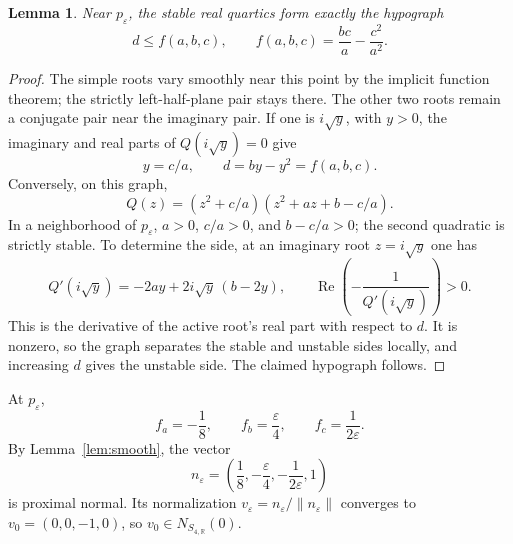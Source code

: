 \documentclass[11pt]{article}
\newtheorem{lemma}{Lemma}
\newcommand{\R}{\mathbb R}
\newcommand{\norm}[1]{\lVert #1\rVert}
\begin{document}
\begin{lemma}\label{lem:quarticboundary}
Near \(p_\varepsilon\), the stable real quartics form exactly the hypograph
\[
 d\leq f(a,b,c),\qquad
 f(a,b,c)=\frac{bc}{a}-\frac{c^2}{a^2}.
\]
\end{lemma}
\begin{proof}
The simple roots vary smoothly near this point by the implicit function theorem; the strictly left-half-plane pair stays there. The other two roots remain a conjugate pair near the imaginary pair. If one is \(i\sqrt y\), with \(y>0\), the imaginary and real parts of \(Q(i\sqrt y)=0\) give
\[
 y=c/a,\qquad d=by-y^2=f(a,b,c).
\]
Conversely, on this graph,
\[
 Q(z)=(z^2+c/a)(z^2+az+b-c/a).
\]
In a neighborhood of \(p_\varepsilon\), \(a>0\), \(c/a>0\), and \(b-c/a>0\); the second quadratic is strictly stable.
To determine the side, at an imaginary root \(z=i\sqrt y\) one has
\[
 Q'(i\sqrt y)=-2ay+2i\sqrt y\,(b-2y),\qquad
 \operatorname{Re}\left(-\frac{1}{Q'(i\sqrt y)}\right)>0.
\]
This is the derivative of the active root's real part with respect to \(d\). It is nonzero, so the graph separates the stable and unstable sides locally, and increasing \(d\) gives the unstable side. The claimed hypograph follows.
\end{proof}

At \(p_\varepsilon\),
\[
 f_a=-\frac18,\qquad f_b=\frac{\varepsilon}{4},
 \qquad f_c=\frac{1}{2\varepsilon}.
\]
By Lemma~\ref{lem:smooth}, the vector
\[
 n_\varepsilon=
 \left(\frac18,-\frac{\varepsilon}{4},
              -\frac{1}{2\varepsilon},1\right)
\]
is proximal normal. Its normalization
\(v_\varepsilon=n_\varepsilon/\norm{n_\varepsilon}\)
converges to \(v_0=(0,0,-1,0)\), so \(v_0\in N_{S_{4,\R}}(0)\).
\end{document}
